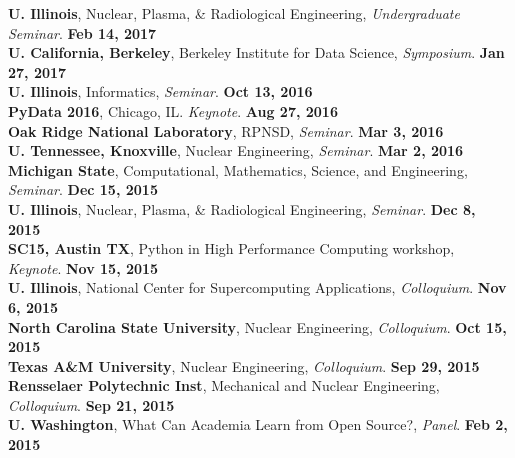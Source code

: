 \documentclass[margin,line]{resume}
\begin{document}
\begin{resume}
      \textbf{U. Illinois}, Nuclear, Plasma, \& Radiological Engineering, \emph{Undergraduate Seminar}.  \hfill\textbf{Feb 14, 2017}\\
      \textbf{U. California, Berkeley}, Berkeley Institute for Data Science, \emph{Symposium}.  \hfill\textbf{Jan 27, 2017}\\
      \textbf{U. Illinois}, Informatics, \emph{Seminar}.  \hfill\textbf{Oct 13, 2016}\\
      \textbf{PyData 2016}, Chicago, IL. \emph{Keynote}.  \hfill\textbf{Aug 27, 2016}\\
      \textbf{Oak Ridge National Laboratory}, RPNSD, \emph{Seminar}.  \hfill\textbf{Mar 3, 2016}\\
      \textbf{U. Tennessee, Knoxville}, Nuclear Engineering, \emph{Seminar}.  \hfill\textbf{Mar 2, 2016}\\
      \textbf{Michigan State}, Computational, Mathematics, Science, and Engineering, \emph{Seminar}.  \hfill\textbf{Dec 15, 2015}\\
      \textbf{U. Illinois}, Nuclear, Plasma, \& Radiological Engineering, \emph{Seminar}.          \hfill\textbf{Dec 8, 2015}\\
      \textbf{SC15, Austin TX}, Python in High Performance Computing workshop, \emph{Keynote}.     \hfill\textbf{Nov 15, 2015}\\
      \textbf{U. Illinois}, National Center for Supercomputing Applications, \emph{Colloquium}.    \hfill\textbf{Nov 6, 2015}\\
      \textbf{North Carolina State University}, Nuclear Engineering, \emph{Colloquium}.            \hfill\textbf{Oct 15, 2015}\\
      \textbf{Texas A\&M University}, Nuclear Engineering, \emph{Colloquium}.                      \hfill\textbf{ Sep 29, 2015}\\
      \textbf{Rensselaer Polytechnic Inst}, Mechanical and Nuclear Engineering, \emph{Colloquium}. \hfill\textbf{Sep 21, 2015}\\
      \textbf{U. Washington}, What Can Academia Learn from Open Source?, \emph{Panel}.   \hfill\textbf{Feb 2, 2015}

\end{resume}
\end{document}
